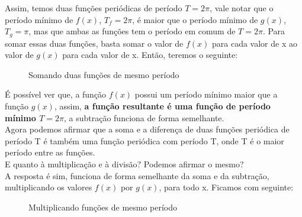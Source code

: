 Assim, temos duas funções periódicas de período $T = 2\pi$, vale notar que o período mínimo 
de $f(x)$, $T_f = 2\pi$, é maior que o período mínimo de $g(x)$, $T_g = \pi$, mas
que ambas as funções tem o período em comum de $T = 2\pi$. Para somar essas duas
funções, basta somar o valor de $f(x)$ para cada valor de x ao valor de $g(x)$ para 
cada valor de x. Então, teremos o seguinte:
\begin{figure}[H]
    \caption{Somando duas funções de mesmo período}
    \label{fig:addExp}
\end{figure}

É possível ver que, a função $f(x)$ possui um período mínimo maior que a função $g(x)$,
assim, \textbf{a função resultante é uma função de período mínimo $T = 2\pi$}, a 
subtração funciona de forma semelhante.\\

Agora podemos afirmar que a soma e a diferença de duas funções 
periódica de período T é também uma função periódica com período T, onde
T é o maior período entre as funções.\\

E quanto à multiplicação e à divisão? Podemos afirmar o mesmo?\\

A resposta é sim, funciona de forma semelhante da soma e da subtração, multiplicando
os valores $f(x)$ por $g(x)$, para todo x. Ficamos com seguinte:
\begin{figure}[H]
    \caption{Multiplicando funções de mesmo período}
    \label{fig:multExp}
\end{figure}

